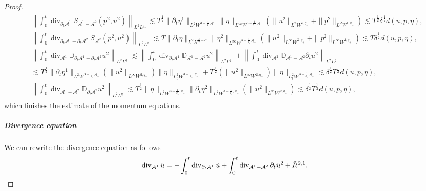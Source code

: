 \documentclass[letterpaper,reqno,10pt,twoside]{amsart}
\theoremstyle{definition}
\theoremstyle{remark}
\def\p{\partial}
\def\dive{\mathop{\rm div}\nolimits}
\begin{document}
\begin{proof}
			\begin{align}
				\begin{aligned}
					&\left\|\int_{0}^{t}\operatorname{div}_{\p_{t}\mathcal{A}^{1}}S_{\mathcal{A}^{1}-\mathcal{A}^{2}}(p^{2},u^{2}) \right\|_{L^{2}L^{q_{-}}}
					\lesssim T^{\frac{1}{2}}\|\p_{t}\eta^{1}\|_{L^{2}W^{3-\frac{1}{q_{-}},q_{-}}}\|\eta\|_{L^{\infty}W^{3-\frac{1}{q_{-}},q_{-}}}(\|u^{2}\|_{L^{2}W^{2,q_{-}}}+\|p^{2}\|_{L^{2}W^{1,q_{-}}})\lesssim T^{\frac{1}{2}}\delta^{\frac{1}{2}}d(u,p,\eta),\\
					&\left\|\int_{0}^{t}\operatorname{div}_{\p_{t}\mathcal{A}^{1}-\p_{t}\mathcal{A}^{2}}S_{\mathcal{A}^{2}}(p^{2},u^{2}) \right\|_{L^{2}L^{q_{-}}}\lesssim T\|\p_{t}\eta\|_{L^{2}H^{\frac{3}{2}-\alpha}}\|\eta^{2}\|_{L^{\infty}W^{3-\frac{1}{q_{+}},q_{+}}}(\|u^{2}\|_{L^{\infty}W^{2,q_{+}}}+\|p^{2}\|_{L^{\infty}W^{1,q_{+}}})\lesssim T\delta^{\frac{1}{2}}d(u,p,\eta),\\
					& \left\|\int_{0}^{t}\operatorname{div}_{\mathcal{A}^{1}}\mathbb{D}_{\p_{t}\mathcal{A}^{1}-\p_{t}\mathcal{A}^{2}}u^{2} \right\|_{L^{2}L^{q_{-}}}\lesssim \left\|\int_{0}^{t}\operatorname{div}_{\p_{t}\mathcal{A}^{1}}\mathbb{D}_{\mathcal{A}^{1}-\mathcal{A}^{2}}u^{2} \right\|_{L^{2}L^{q_{-}}}+ \left\|\int_{0}^{t}\operatorname{div}_{\mathcal{A}^{1}}\mathbb{D}_{\mathcal{A}^{1}-\mathcal{A}^{2}}\p_{t}u^{2} \right\|_{L^{2}L^{q_{-}}}\\
					&\lesssim T^{\frac{1}{2}}\|\p_{t}\eta^{1}\|_{L^{2}W^{3-\frac{1}{q_{-}},q_{-}}}(\|u^{2}\|_{L^{\infty}W^{2,q_{-}}})\|\eta\|_{L_{t}^{2}W^{3-\frac{1}{q_{-}},q_{-}}}+T^{\frac{1}{2}}(\|u^{2}\|_{L^{\infty}W^{2,q_{-}}})\|\eta\|_{L_{t}^{2}W^{3-\frac{1}{q_{-}},q_{-}}}\lesssim \delta^{\frac{1}{2}}T^{\frac{1}{2}}d(u,p,\eta),\\
					& \left \|\int_{0}^{t}\operatorname{div}_{\mathcal{A}^{1}-\mathcal{A}^{2}}\mathbb{D}_{\p_{t}\mathcal{A}^{2}}u^{2} \right\|_{L^{2}L^{q_{-}}}\lesssim T^{\frac{1}{2}}\|\eta\|_{L^{2}W^{3-\frac{1}{q_{-}},q_{-}}}\|\p_{t}\eta^{2}\|_{L^{2}W^{3-\frac{1}{q_{-}},q_{-}}}(\|u^{2}\|_{L^{\infty}W^{2,q_{-}}})\lesssim \delta^{\frac{1}{2}}T^{\frac{1}{2}}d(u,p,\eta),
				\end{aligned}
			\end{align}
			\noindent which finishes the estimate of the momentum equations.
			
			\subparagraph{\underline{Divergence equation}}
			We can rewrite the divergence equation as follows
			\begin{align}{\label{eq:elliptic_2}}
				\dive_{\mathcal{A}^{1}}\tilde{u}=-\int_{0}^{t}\operatorname{div}_{\p_{t}\mathcal{A}^{1}}\tilde{u}+\int_{0}^{t}\dive_{\mathcal{A}^{1}-\mathcal{A}^{2}}\p_{t}\tilde{u}^{2}+\tilde{R}^{2,1}.
			\end{align}
			

\end{proof}
\end{document}
